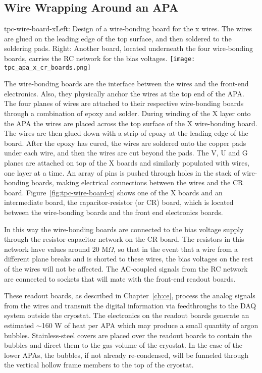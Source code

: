 \subsection{Wire Wrapping Around an APA}


\begin{cdrfigure}{tpc-wire-board-x}{Left: Design of a wire-bonding board for the x wires.  The wires are glued on the leading edge of the top surface, and then soldered to the soldering pads. Right: Another board, located underneath the four wire-bonding boards, carries the RC network for the bias voltages.}
\texttt{[image: tpc\_apa\_x\_cr\_boards.png]}
\end{cdrfigure}

The wire-bonding boards are the interface between the wires and the front-end electronics.  Also, they physically anchor the wires at the top end of the APA.  The four planes of wires are attached to their respective wire-bonding boards through a combination of epoxy and solder. During winding of the X layer onto the APA the wires are placed across the top surface of the X wire-bonding board. The wires are then glued down with a strip of epoxy at the leading edge of the board.  After the epoxy has cured, the wires are soldered onto the copper pads under each wire, and then the wires are cut beyond the pads. The V, U and G planes are attached on top of the X boards and similarly populated with wires, one layer at a time. An array of pins is pushed through holes in the stack of wire-bonding boards, making electrical connections between the wires and the CR board.   
Figure~\ref{fig:tpc-wire-board-x} shows one of the X boards and an intermediate board, the capacitor-resistor (or CR) board, which is located between the wire-bonding boards and the front end electronics boards.  

In this way the wire-bonding boards are connected to the bias voltage supply through the resistor-capacitor network on the CR board. The resistors in this network have values around 20 M$\Omega$, so that in the event that a wire from a different plane breaks and is shorted to these wires, the bias voltages on the rest of the wires will not be affected. The AC-coupled signals from the RC network are connected to sockets that will mate with the front-end readout boards.

These readout boards, as described in Chapter~\ref{ch:ce}, process the analog signals from the wires and transmit the digital information via feedthroughs to the DAQ system outside the cryostat. The electronics on the readout boards generate an estimated $\sim$160 W of heat per APA which may produce a small quantity of argon bubbles.  Stainless-steel covers are placed over the readout boards to contain the bubbles and direct them to the gas volume of the cryostat. In the case of the lower APAs, the bubbles, if not already re-condensed, will be funneled through the vertical hollow frame members to the top of the cryostat.


